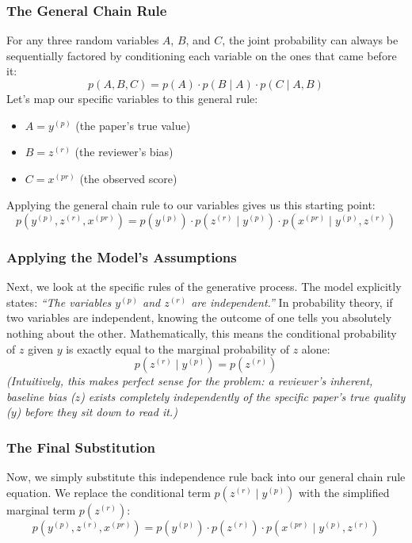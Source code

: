 \documentclass[twoside, 10pt]{article}
\begin{document}
\subsubsection*{The General Chain Rule}
For any three random variables $A$, $B$, and $C$, the joint probability can always be sequentially factored by conditioning each variable on the ones that came before it:
\[
p(A, B, C) = p(A) \cdot p(B \mid A) \cdot p(C \mid A, B)
\]
Let's map our specific variables to this general rule:
\begin{itemize}
    \item $A = y^{(p)}$ (the paper's true value)
    \item $B = z^{(r)}$ (the reviewer's bias)
    \item $C = x^{(pr)}$ (the observed score)
\end{itemize}
Applying the general chain rule to our variables gives us this starting point:
\[
p(y^{(p)}, z^{(r)}, x^{(pr)}) = p(y^{(p)}) \cdot p(z^{(r)} \mid y^{(p)}) \cdot p(x^{(pr)} \mid y^{(p)}, z^{(r)})
\]
\subsubsection*{Applying the Model's Assumptions}
Next, we look at the specific rules of the generative process. The model explicitly states: \textit{``The variables $y^{(p)}$ and $z^{(r)}$ are independent.''}
In probability theory, if two variables are independent, knowing the outcome of one tells you absolutely nothing about the other. Mathematically, this means the conditional probability of $z$ given $y$ is exactly equal to the marginal probability of $z$ alone:
\[
p(z^{(r)} \mid y^{(p)}) = p(z^{(r)})
\]
\textit{(Intuitively, this makes perfect sense for the problem: a reviewer's inherent, baseline bias ($z$) exists completely independently of the specific paper's true quality ($y$) before they sit down to read it.)}
\subsubsection*{The Final Substitution}
Now, we simply substitute this independence rule back into our general chain rule equation. We replace the conditional term $p(z^{(r)} \mid y^{(p)})$ with the simplified marginal term $p(z^{(r)})$:
\[
p(y^{(p)}, z^{(r)}, x^{(pr)}) = p(y^{(p)}) \cdot p(z^{(r)}) \cdot p(x^{(pr)} \mid y^{(p)}, z^{(r)})
\]
\end{document}
